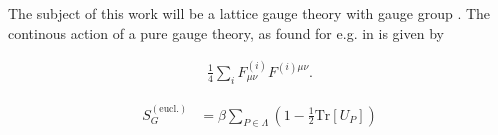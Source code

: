 The subject of this work will be a lattice gauge theory with gauge group \SUTwo. The continous action of a pure \SUTwo gauge theory, as found for e.g. in \cite{Peskin:1995} is given by


\begin{align*}
\frac{1}{4} \sum_i F_{\mu \nu}^{(i)} F^{(i) \mu \nu} \textrm{.}
\end{align*}




\begin{align*}
 S_G^{(\textrm{eucl.})} & = \beta \sum_{P \in \Lambda} \left(1-\frac{1}{2} \textrm{Tr} \left[ U_P \right] \right)
\end{align*}
